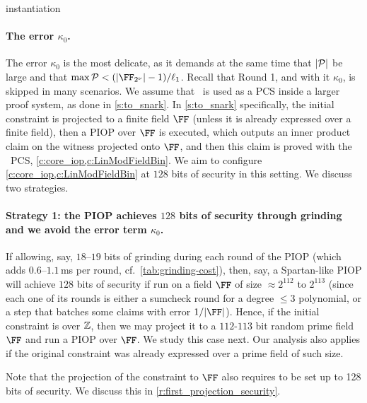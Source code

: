 \begin{lncsappendix}{instantiation}
\paragraph{The error $\kappa_0$.} The error $\kappa_0$ is the most delicate, as it demands at the same time that $|\mathcal{P}|$ be large and that $\max\cP < \fieldboundsizeexponent$. Recall that Round 1, and with it $\kappa_0$, is skipped in many scenarios. We assume that \ftwoz\ is used as a PCS inside a larger proof system, as done in \cref{s:to_snark}. In \cref{s:to_snark} specifically, the initial constraint is projected to a finite field $\FF$ (unless it is already expressed over a finite field), then a PIOP over $\FF$  is executed, which outputs an inner product claim on the  witness projected onto $\FF$, and then this claim is proved with the \ftwoz\ PCS, \cref{c:core_iop,c:LinModFieldBin}. We aim to configure \cref{c:core_iop,c:LinModFieldBin} at $128$ bits of security in this setting. We discuss two strategies. 


\paragraph{Strategy 1: the PIOP achieves $128$ bits of security through grinding and we avoid the error term $\kappa_0$.} If allowing, say, $18$--$19$ bits of grinding during each round of the PIOP (which adds $0.6$--$1.1$\,ms per round, cf.\ \cref{tab:grinding-cost}), then, say, a Spartan-like PIOP will achieve $128$ bits of security if run on a field $\FF$ of size $\approx 2^{112}$ to  $2^{113}$  (since each one of its rounds is either a sumcheck round for a degree $\leq 3$ polynomial, or a step that batches some claims with error $1/|\FF|$). Hence, if the initial constraint is over $\mathbb{Z}$, then we may project it to a $112$-$113$ bit random prime field $\FF$ and run a PIOP over $\FF$. We study this case next. Our analysis also applies if the original constraint was already expressed over a prime field of such size.  

Note that the projection of the constraint to $\FF$ also requires to be set up to 128 bits of security. We discuss this in \cref{r:first_projection_security}. 







\end{lncsappendix}
